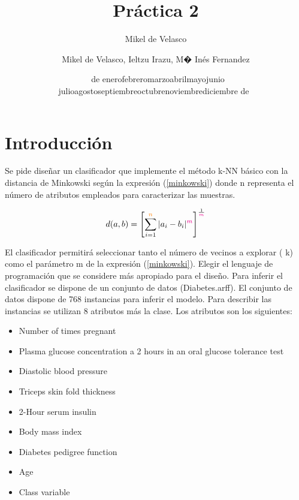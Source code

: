 \documentclass[a4paper,10pt]{article}
\theoremstyle{plain}
\def\today{\number\day~de\space\ifcase\month\or 
  enero\or febrero\or marzo\or abril\or mayo\or junio\or 
  julio\or agosto\or septiembre\or octubre\or noviembre\or diciembre\fi 
  \space de~\number\year}
\begin{document}
\author{Mikel de Velasco}
\title{Pr\'actica 2}

\author{Mikel de Velasco, Ieltzu Irazu, M� In\'es Fernandez}
\date{\today}
\maketitle



\section{Introducci\'on}

Se pide diseñar un clasificador que implemente el m\'etodo k-NN b\'asico con la distancia de
Minkowski seg\'un la expresi\'on (\ref{minkowski}) donde {\color[rgb]{1,.5,0} n} representa el n\'umero de atributos empleados para caracterizar las muestras.

\begin{equation}\label{minkowski}
d(a,b)=\left[\sum_{i=1}^{{\color[rgb]{1,.5,0} n}}|a_{i}-b_{i}|^{\color{magenta} m}\right]^{\frac{1}{\color{magenta} m}}
\end{equation}

El clasificador permitir\'a seleccionar tanto el n\'umero de vecinos a explorar ({\color{blue} k}) como el par\'ametro {\color{magenta} m} de la expresi\'on (\ref{minkowski}). Elegir el lenguaje de programaci\'on que se considere m\'as apropiado para el diseño.
Para inferir el clasificador se dispone de un conjunto de datos (Diabetes.arff). El conjunto de datos dispone de 768 instancias para inferir el modelo. Para describir las instancias se utilizan 8 atributos m\'as la clase. Los atributos son los siguientes:

\begin{itemize}
\item Number of times pregnant
\item Plasma glucose concentration a 2 hours in an oral glucose tolerance test
\item Diastolic blood pressure 
\item Triceps skin fold thickness 
\item 2-Hour serum insulin 
\item Body mass index 
\item Diabetes pedigree function
\item Age 
\item Class variable 
\end{itemize}
\end{document}
